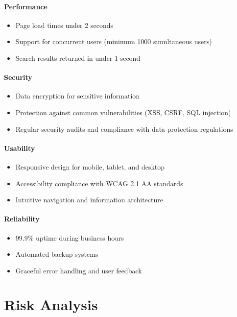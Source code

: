 \documentclass[12pt,a4paper]{article}
\begin{document}
\paragraph{Performance}
\begin{itemize}
    \item Page load times under 2 seconds
    \item Support for concurrent users (minimum 1000 simultaneous users)
    \item Search results returned in under 1 second
\end{itemize}

\paragraph{Security}
\begin{itemize}
    \item Data encryption for sensitive information
    \item Protection against common vulnerabilities (XSS, CSRF, SQL injection)
    \item Regular security audits and compliance with data protection regulations
\end{itemize}

\paragraph{Usability}
\begin{itemize}
    \item Responsive design for mobile, tablet, and desktop
    \item Accessibility compliance with WCAG 2.1 AA standards
    \item Intuitive navigation and information architecture
\end{itemize}

\paragraph{Reliability}
\begin{itemize}
    \item 99.9\% uptime during business hours
    \item Automated backup systems
    \item Graceful error handling and user feedback
\end{itemize}

\section{Risk Analysis}
\end{document}
